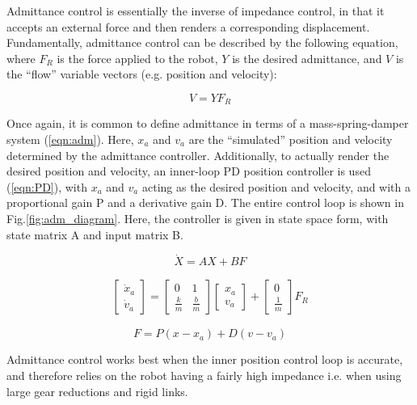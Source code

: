 \documentclass[12pt]{report}
\begin{document}
	
	Admittance control is essentially the inverse of impedance control, in that it accepts an external force and then renders a corresponding displacement. Fundamentally, admittance control can be described by the following equation, where $F_R$ is the force applied to the robot, $Y$ is the desired admittance, and $V$ is the ``flow'' variable vectors (e.g. position and velocity):
	
	\begin{equation}
	V = YF_R 
	\end{equation} 
	
	Once again, it is common to define admittance in terms of a mass-spring-damper system (\ref{eqn:adm}). Here, $x_a$ and $v_a$ are the ``simulated'' position and velocity determined by the admittance controller. Additionally, to actually render the desired position and velocity, an inner-loop PD position controller is used (\ref{eqn:PD}), with $x_a$ and $v_a$ acting as the desired position and velocity, and with a proportional gain P and a derivative gain D. The entire control loop is shown in Fig.\ref{fig:adm_diagram}. Here, the controller is given in state space form, with state matrix A and input matrix B. 
	
	
	\begin{equation}
	\dot{X} = AX + BF
	\end{equation}
	
	\begin{gather} \label{eqn:adm}
	\begin{bmatrix}
    	\dot{x}_a \\
    	\dot{v}_a 
    \end{bmatrix} 
    =
    \begin{bmatrix}
    	0 & 1 \\
    	\frac{k}{m} & \frac{b}{m}
    \end{bmatrix} 
    \begin{bmatrix}
    	x_a \\
    	v_a
    \end{bmatrix}  
    +
    \begin{bmatrix}
    	0 \\
    	\frac{1}{m}
    \end{bmatrix}
    F_R   	
	\end{gather}
	
	\begin{equation} \label{eqn:PD}
	F = P(x - x_a) + D(v - v_a)
	\end{equation}

	Admittance control works best when the inner position control loop is accurate, and therefore relies on the robot having a fairly high impedance i.e. when using large gear reductions and rigid links. 
	
\end{document}
